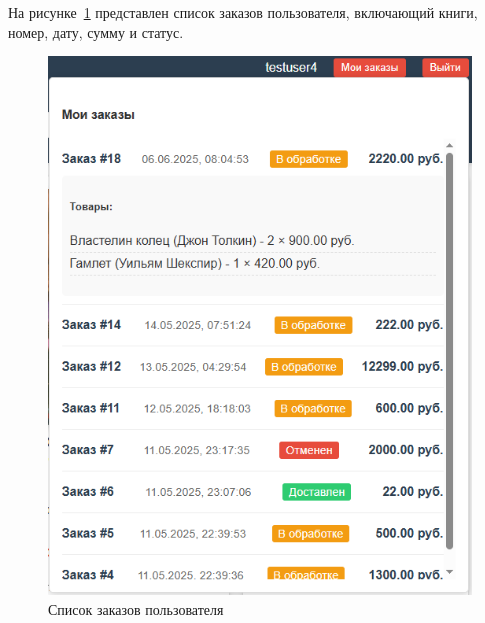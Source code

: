 На рисунке~\ref{fig:222} представлен список заказов пользователя, включающий книги, номер, дату, сумму и статус.
\begin{figure}[H]
	\centering
	\includegraphics[width=0.7\linewidth]{images/222}
	\caption{Список заказов пользователя}
	\label{fig:222}
\end{figure}

